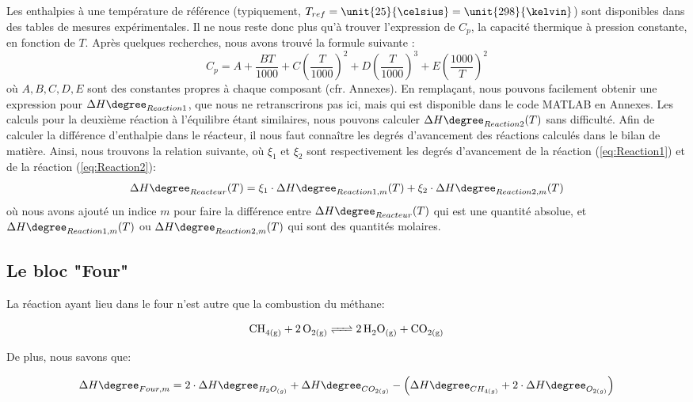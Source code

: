 Les enthalpies à une température de référence (typiquement, $T_{ref}=\unit{25}{\celsius}=\unit{298}{\kelvin}$) sont
disponibles dans des tables de mesures expérimentales. Il ne nous reste donc plus qu'à trouver
l'expression de $C_p$, la capacité thermique à pression constante, en fonction de $T$.
Après quelques recherches, nous avons trouvé la formule suivante \cite{NIST}: \begin{equation}\label{eqref:capacite}
C_p=A+\dfrac{BT}{1000}+C\left(\dfrac{T}{1000}\right)^2+D\left(\dfrac{T}{1000}\right)^3+E\left(\dfrac{1000}{T}\right)^2
\end{equation} où $A,B,C,D,E$ sont des constantes propres à chaque composant (cfr. Annexes).
En remplaçant, nous pouvons facilement obtenir une expression pour $\Delta H\degree_{Reaction1}$, que nous ne retranscrirons pas
ici, mais qui est disponible dans le code \textsc{MATLAB} en Annexes. 
Les calculs pour la deuxième réaction à l'équilibre étant similaires, nous pouvons
calculer $\Delta H\degree_{Reaction2}(T)$ sans difficulté. Afin de calculer la différence d'enthalpie dans le réacteur,
il nous faut connaître les degrés d'avancement des réactions calculés dans le bilan de matière. Ainsi, nous
trouvons la relation suivante, où $\xi_1$ et $\xi_2$ sont respectivement les degrés d'avancement de la
réaction (\ref{eq:Reaction1}) et de la réaction (\ref{eq:Reaction2}):
\begin{equation}\label{eq:deltaHreacteur}{\Delta H\degree_{Reacteur}(T)=\xi_1\cdot\Delta H\degree_{Reaction1,m}(T)+\xi_2\cdot\Delta H\degree_{Reaction2,m}(T)}\end{equation}
où nous avons ajouté un indice $m$ pour faire la différence entre $\Delta H\degree_{Reacteur}(T)$ qui est une quantité absolue, 
et $\Delta H\degree_{Reaction1,m}(T)$ ou $\Delta H\degree_{Reaction2,m}(T)$ qui sont des quantités molaires.

\newpage

\subsection{Le bloc "Four"}
La réaction ayant lieu dans le four n'est autre que la combustion du méthane:

\begin{equation}\label{combust.methane}\ce{CH_{4(g)} + 2O_{2(g)} <=> 2H_2O_{(g)} + CO_{2(g)}}\end{equation}

De plus, nous savons que:

$$\Delta H\degree_{Four,m} = 2\cdot \Delta H\degree_{H_{2}O_{(g)}} + \Delta H\degree_{CO_{2(g)}}
- \left(\Delta H\degree_{CH_{4(g)}} + 2\cdot \Delta H\degree_{O_{2(g)}}\right)$$

